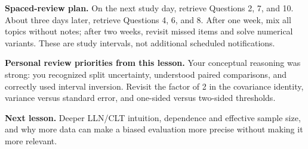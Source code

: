 \documentclass[11pt,letterpaper]{article}
\theoremstyle{definition}
\theoremstyle{remark}
\numberwithin{equation}{section}
\begin{document}
\textbf{Spaced-review plan.} On the next study day, retrieve Questions 2, 7, and 10.
About three days later, retrieve Questions 4, 6, and 8. After one week, mix all
topics without notes; after two weeks, revisit missed items and solve numerical
variants. These are study intervals, not additional scheduled notifications.

\textbf{Personal review priorities from this lesson.} Your conceptual reasoning
was strong: you recognized split uncertainty, understood paired comparisons,
and correctly used interval inversion. Revisit the factor of 2 in the covariance
identity, variance versus standard error, and one-sided versus two-sided thresholds.

\textbf{Next lesson.} Deeper LLN/CLT intuition, dependence and effective sample
size, and why more data can make a biased evaluation more precise without making
it more relevant.
\newpage
\end{document}
